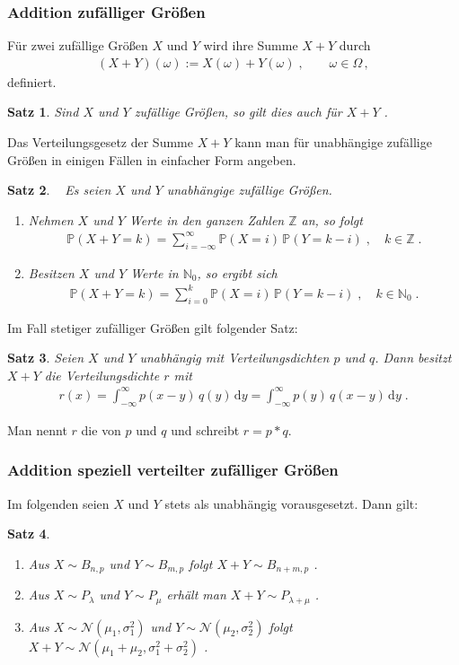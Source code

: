 \documentclass[ngerman,draft,parskip=half,twoside]{scrartcl}
\newtheorem{thm}{Satz}[section]
\newcommand*{\highl}[2][]{\textbf{\boldmath{#2}}%
  \ifthenelse{\equal{#1}{}}{\index{#2}}{\index{#1}}%
}
\newcommand*{\N}{\mathbb{N}}      %
\newcommand*{\Z}{\mathbb{Z}}      %
\newcommand*{\WKM}{\mathbb{P}}      %
\begin{document}
\subsubsection{Addition zufälliger Größen}
Für zwei zufällige Größen $X$  und $Y$ wird ihre Summe $X+Y$ durch
\begin{gather*}
  (X+Y)(\omega):=X(\omega)+Y(\omega)\;,\qquad \omega\in\Omega\,,
\end{gather*}
definiert.
\begin{thm}
Sind $X$ und $Y$ zufällige Größen, so gilt dies auch für $X+Y$ .
\end{thm}
Das Verteilungsgesetz der Summe $X+Y$ kann man für unabhängige zufällige Größen in einigen
Fällen in einfacher Form angeben.
\begin{thm}~
Es seien $X$ und $Y$ unabhängige zufällige Größen.
\begin{enumerate}
\item
Nehmen $X$ und $Y$ Werte in den ganzen Zahlen $\Z$ an, so folgt
  \begin{gather*}
    \WKM(X+Y=k)=\sum_{i=-\infty}^\infty\WKM(X=i)\,\WKM(Y=k-i)\;,\quad k\in \Z\;.
  \end{gather*}
\item
Besitzen $X$ und $Y$ Werte in $\N_0$, so ergibt sich
  \begin{gather*}
    \WKM(X+Y=k)=\sum_{i=0}^k\WKM(X=i)\,\WKM(Y=k-i)\;,\quad k\in \N_0\;.
  \end{gather*}
\end{enumerate}
\end{thm}
Im Fall stetiger zufälliger Größen gilt folgender Satz:
\begin{thm}
Seien $X$ und $Y$ unabhängig mit Verteilungsdichten $p$ und $q$. Dann besitzt $X+Y$
die Verteilungsdichte $r$  mit
  \begin{gather*}
    r(x)=\int_{-\infty}^\infty p(x-y)\,q(y)\,\mathrm d y = \int_{-\infty}^\infty p(y)\,q(x-y)\,\mathrm d y \;.
  \end{gather*}
\end{thm}
Man nennt $r$ die \highl{Faltung} von $p$ und $q$ und schreibt $r=p*q$.
\subsubsection{Addition speziell verteilter zufälliger Größen}
Im folgenden seien $X$ und $Y$ stets als unabhängig vorausgesetzt. Dann gilt:
\begin{thm}~
  \begin{enumerate}[label=(\alph*)]
   \item
Aus $X\sim B_{n,p}$ und $Y\sim B_{m,p}$ folgt $X+Y\sim B_{n+m,p}$  .
   \item
Aus $X\sim P_\lambda$ und $Y\sim P_\mu$ erhält man $X+Y\sim P_{\lambda+\mu}$ .
   \item
Aus $X\sim\mathcal N(\mu_1,\sigma_1^2)$ und $Y\sim\mathcal N(\mu_2,\sigma_2^2)$ folgt
$X+Y\sim \mathcal N(\mu_1+\mu_2,\sigma_1^2+\sigma_2^2)$ .
  \end{enumerate}
\end{thm}
\end{document}
